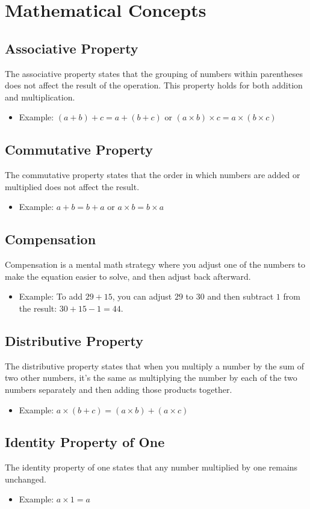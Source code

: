 \documentclass{article}
\date{}
\begin{document}
\fontsize{13}{15} \selectfont %


\section{Mathematical Concepts}

\subsection{Associative Property}
The associative property states that the grouping of numbers within parentheses does not affect the result of the operation. This property holds for both addition and multiplication.
\begin{itemize}
\item Example: \( (a + b) + c = a + (b + c) \) or \( (a \times b) \times c = a \times (b \times c) \)
\end{itemize}

\subsection{Commutative Property}
The commutative property states that the order in which numbers are added or multiplied does not affect the result.
\begin{itemize}
\item Example: \( a + b = b + a \) or \( a \times b = b \times a \)
\end{itemize}

\subsection{Compensation}
Compensation is a mental math strategy where you adjust one of the numbers to make the equation easier to solve, and then adjust back afterward.
\begin{itemize}
\item Example: To add \( 29 + 15 \), you can adjust \( 29 \) to \( 30 \) and then subtract \( 1 \) from the result: \( 30 + 15 - 1 = 44 \).
\end{itemize}



\subsection{Distributive Property}
The distributive property states that when you multiply a number by the sum of two other numbers, it's the same as multiplying the number by each of the two numbers separately and then adding those products together.
\begin{itemize}
\item Example: \( a \times (b + c) = (a \times b) + (a \times c) \)
\end{itemize}



\subsection{Identity Property of One}
The identity property of one states that any number multiplied by one remains unchanged.
\begin{itemize}
\item Example: \( a \times 1 = a \)
\end{itemize}
\end{document}
